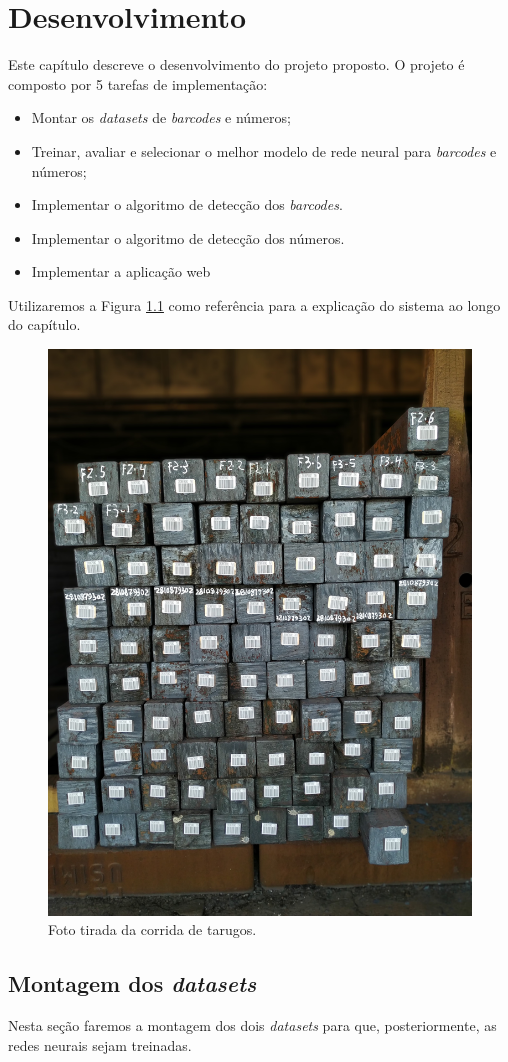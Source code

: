 
\chapter{Desenvolvimento}

Este capítulo descreve o desenvolvimento do projeto proposto. O projeto é composto por 5 tarefas de implementação:

\begin{itemize}
    \item Montar os \textit{datasets} de \textit{barcodes} e números;
    \item Treinar, avaliar e selecionar o melhor modelo de rede neural para \textit{barcodes} e números;
    \item Implementar o algoritmo de detecção dos \textit{barcodes}.
    \item Implementar o algoritmo de detecção dos números.
    \item Implementar a aplicação web
\end{itemize}

Utilizaremos a Figura \ref{fig:imagemBase} como referência para a explicação do sistema ao longo do capítulo.

\begin{figure}[h!]
	\centering
	\includegraphics[width=0.5\linewidth]{figuras/img1.jpg}
	\caption{Foto tirada da corrida de tarugos.}
	\label{fig:imagemBase}
\end{figure}

\section{Montagem dos \textit{datasets}}

Nesta seção faremos a montagem dos dois \textit{datasets} para que, posteriormente, as redes neurais sejam treinadas. 

